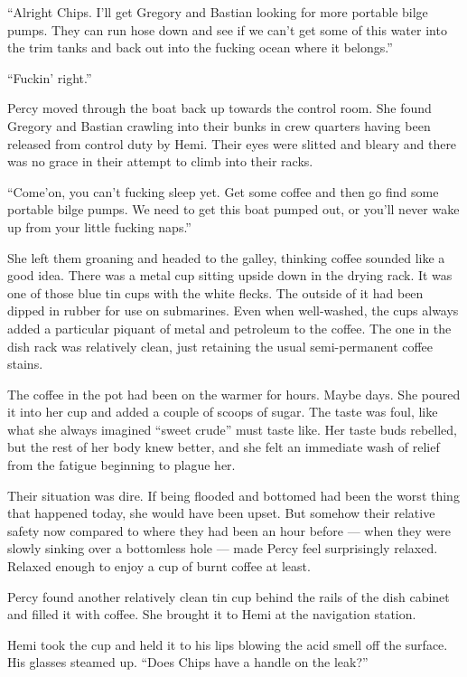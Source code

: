 \documentclass[]{article}
\begin{document}
\begin{multicols}{2}
``Alright Chips. I'll get Gregory and Bastian looking for more portable
bilge pumps. They can run hose down and see if we can't get some of this
water into the trim tanks and back out into the fucking ocean where it
belongs.''

``Fuckin' right.''

Percy moved through the boat back up towards the control room. She found
Gregory and Bastian crawling into their bunks in crew quarters having
been released from control duty by Hemi. Their eyes were slitted and
bleary and there was no grace in their attempt to climb into their
racks.

``Come'on, you can't fucking sleep yet. Get some coffee and then go find
some portable bilge pumps. We need to get this boat pumped out, or
you'll never wake up from your little fucking naps.''

She left them groaning and headed to the galley, thinking coffee sounded
like a good idea. There was a metal cup sitting upside down in the
drying rack. It was one of those blue tin cups with the white flecks.
The outside of it had been dipped in rubber for use on submarines. Even
when well-washed, the cups always added a particular piquant of metal
and petroleum to the coffee. The one in the dish rack was relatively
clean, just retaining the usual semi-permanent coffee stains.

The coffee in the pot had been on the warmer for hours. Maybe days. She
poured it into her cup and added a couple of scoops of sugar. The taste
was foul, like what she always imagined ``sweet crude'' must taste like.
Her taste buds rebelled, but the rest of her body knew better, and she
felt an immediate wash of relief from the fatigue beginning to plague
her.

Their situation was dire. If being flooded and bottomed had been the
worst thing that happened today, she would have been upset. But somehow
their relative safety now compared to where they had been an hour before
--- when they were slowly sinking over a bottomless hole --- made Percy
feel surprisingly relaxed. Relaxed enough to enjoy a cup of burnt coffee
at least.

Percy found another relatively clean tin cup behind the rails of the
dish cabinet and filled it with coffee. She brought it to Hemi at the
navigation station.

Hemi took the cup and held it to his lips blowing the acid smell off the
surface. His glasses steamed up. ``Does Chips have a handle on the
leak?''


\end{multicols}
\end{document}
